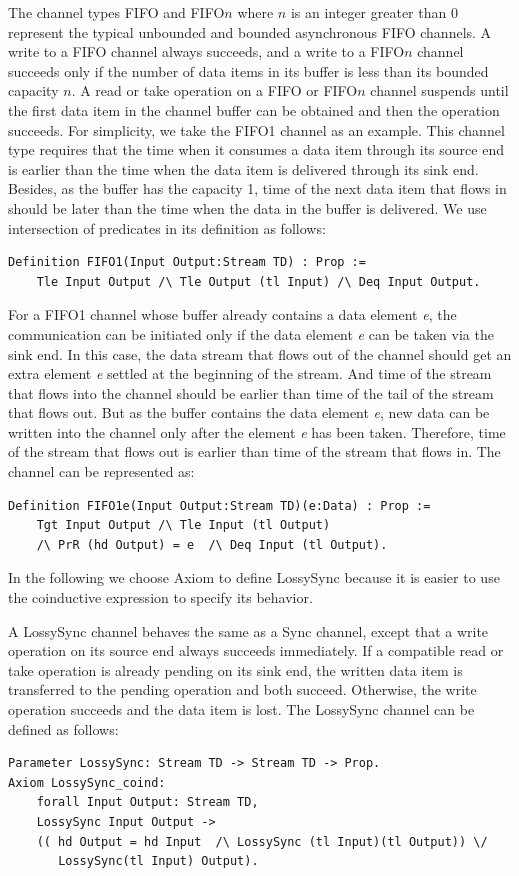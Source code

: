 \documentclass[preprint,3p]{elsarticle}
\begin{document}
The channel types FIFO and FIFO$n$ where $n$ is an integer greater than $0$ represent the
typical unbounded and bounded asynchronous FIFO channels. A write to a FIFO channel always succeeds, and a write to a FIFO$n$ channel succeeds only if the
number of data items in its buffer is less than its bounded capacity $n$. A read or take operation on a FIFO or FIFO$n$ channel suspends until the first data item
in the channel buffer can be obtained and then the operation succeeds.
For simplicity, we take the FIFO1 channel as an example. This channel type requires that the time when it consumes a data item through its source end is earlier than the time when the data item is delivered through its sink end. Besides, as the buffer has the capacity 1, time of the next data item that flows in should be later than the time when the data in the buffer is delivered. We use intersection of predicates in its definition as follows:
\begin{lstlisting}[language=coq]
Definition FIFO1(Input Output:Stream TD) : Prop :=
    Tle Input Output /\ Tle Output (tl Input) /\ Deq Input Output.
\end{lstlisting}

For a FIFO1 channel whose buffer already contains a data element \emph{e}, the communication can be initiated only if the data element \emph{e} can be taken via the sink end. In this case, the data stream that flows out of the channel should get an extra element \emph{e} settled at the beginning of the stream. And time of the stream that flows into the channel should be earlier than time of the tail of the stream that flows out. But as the buffer contains the data element \emph{e}, new data can be written into the channel only after the element \emph{e} has been taken. Therefore, time of the stream that flows out is earlier than time of the stream that flows in. The channel can be represented as:
\begin{lstlisting}[language=coq]
Definition FIFO1e(Input Output:Stream TD)(e:Data) : Prop :=
    Tgt Input Output /\ Tle Input (tl Output)
    /\ PrR (hd Output) = e  /\ Deq Input (tl Output).
\end{lstlisting}

In the following we choose Axiom to define LossySync
because it is easier to use the coinductive expression to specify
its behavior.

A LossySync channel behaves the same as a Sync channel, except that a write operation on its source end always succeeds immediately. If a compatible read or take operation is already pending on its sink end, the written data item is transferred to the pending operation and both succeed. Otherwise, the write operation succeeds and the data item is lost. The LossySync channel can be defined as follows:
\begin{lstlisting}[language=coq]
Parameter LossySync: Stream TD -> Stream TD -> Prop.
Axiom LossySync_coind:
    forall Input Output: Stream TD,
    LossySync Input Output ->
    (( hd Output = hd Input  /\ LossySync (tl Input)(tl Output)) \/
       LossySync(tl Input) Output).
\end{lstlisting}
\end{document}
